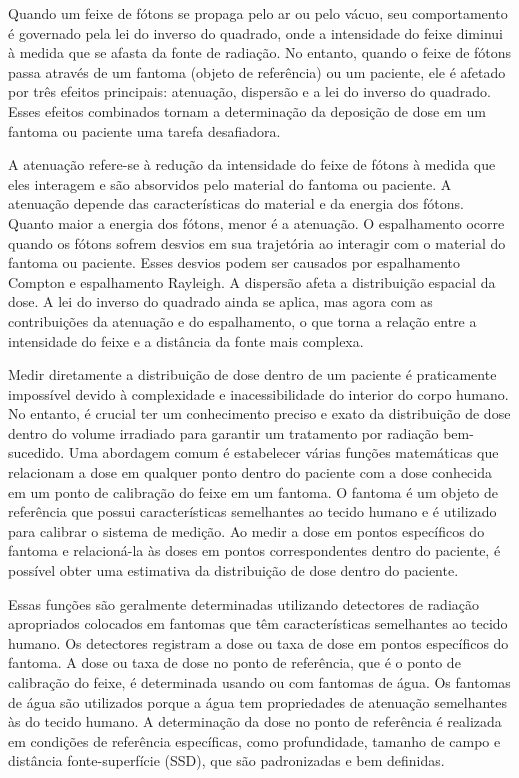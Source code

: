 \documentclass[11pt,a4paper]{article}
\begin{document}
	Quando um feixe de fótons se propaga pelo ar ou pelo vácuo, seu comportamento é governado pela lei do inverso do quadrado, onde a intensidade do feixe diminui à medida que se afasta da fonte de radiação. No entanto, quando o feixe de fótons passa através de um fantoma (objeto de referência) ou um paciente, ele é afetado por três efeitos principais: atenuação, dispersão e a lei do inverso do quadrado. Esses efeitos combinados tornam a determinação da deposição de dose em um fantoma ou paciente uma tarefa desafiadora.

	A atenuação refere-se à redução da intensidade do feixe de fótons à medida que eles interagem e são absorvidos pelo material do fantoma ou paciente. A atenuação depende das características do material e da energia dos fótons. Quanto maior a energia dos fótons, menor é a atenuação. O espalhamento ocorre quando os fótons sofrem desvios em sua trajetória ao interagir com o material do fantoma ou paciente. Esses desvios podem ser causados por espalhamento Compton e espalhamento Rayleigh. A dispersão afeta a distribuição espacial da dose. A lei do inverso do quadrado ainda se aplica, mas agora com as contribuições da atenuação e do espalhamento, o que torna a relação entre a intensidade do feixe e a distância da fonte mais complexa.

	Medir diretamente a distribuição de dose dentro de um paciente é praticamente impossível devido à complexidade e inacessibilidade do interior do corpo humano. No entanto, é crucial ter um conhecimento preciso e exato da distribuição de dose dentro do volume irradiado para garantir um tratamento por radiação bem-sucedido. Uma abordagem comum é estabelecer várias funções matemáticas que relacionam a dose em qualquer ponto dentro do paciente com a dose conhecida em um ponto de calibração do feixe em um fantoma. O fantoma é um objeto de referência que possui características semelhantes ao tecido humano e é utilizado para calibrar o sistema de medição. Ao medir a dose em pontos específicos do fantoma e relacioná-la às doses em pontos correspondentes dentro do paciente, é possível obter uma estimativa da distribuição de dose dentro do paciente.

	Essas funções são geralmente determinadas utilizando detectores de radiação apropriados colocados em fantomas que têm características semelhantes ao tecido humano. Os detectores registram a dose ou taxa de dose em pontos específicos do fantoma. A dose ou taxa de dose no ponto de referência, que é o ponto de calibração do feixe, é determinada usando ou com fantomas de água. Os fantomas de água são utilizados porque a água tem propriedades de atenuação semelhantes às do tecido humano. A determinação da dose no ponto de referência é realizada em condições de referência específicas, como profundidade, tamanho de campo e distância fonte-superfície (SSD), que são padronizadas e bem definidas.
\end{document}
